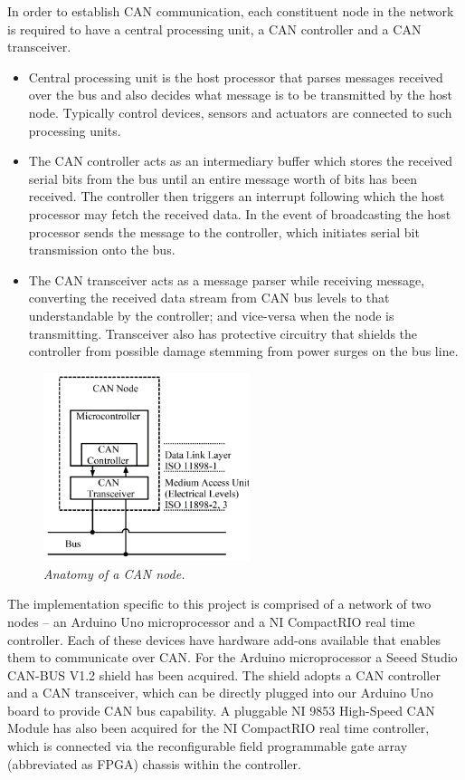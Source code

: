 \documentclass{article}
\begin{document}
\begin{flushleft}
In order to establish CAN communication, each constituent node in the network is required to have a central processing unit, a CAN controller and a CAN transceiver. 
\begin{itemize}
	\item Central processing unit is the host processor that parses messages received over the bus and also decides what message is to be transmitted by the host node. Typically control devices, sensors and actuators are connected to such processing units.
    \item The CAN controller acts as an intermediary buffer which stores the received serial bits from the bus until an entire message worth of bits has been received. The controller then triggers an interrupt following which the host processor may fetch the received data. In the event of broadcasting the host processor sends the message to the controller, which initiates serial bit transmission onto the bus.
    \item The CAN transceiver acts as a message parser while receiving message, converting the received data stream from CAN bus levels to that understandable by the controller; and vice-versa when the node is transmitting. Transceiver also has protective circuitry that shields the controller from possible damage stemming from power surges on the bus line.
\end{itemize}

\begin{figure}[!ht]
\centering 
\includegraphics[width=6cm]{fig_4.png}
\caption{\small \sl Anatomy of a CAN node.}  
\end{figure}
\end{flushleft}

\begin{flushleft}
The implementation specific to this project is comprised of a network of two nodes – an Arduino Uno microprocessor and a NI CompactRIO real time controller. Each of these devices have hardware add-ons available that enables them to communicate over CAN. For the Arduino microprocessor a Seeed Studio CAN-BUS V1.2 shield has been acquired. The shield adopts a CAN controller and a CAN transceiver, which can be directly plugged into our Arduino Uno board to provide CAN bus capability. A pluggable NI 9853 High-Speed CAN Module has also been acquired for the NI CompactRIO real time controller, which is connected via the reconfigurable field programmable gate array (abbreviated as FPGA) chassis within the controller.
\end{flushleft}
\end{document}
